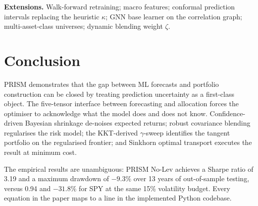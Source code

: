 \documentclass[10pt,twocolumn]{article}
\begin{document}
\textbf{Extensions.}
Walk-forward retraining; macro features; conformal prediction
intervals replacing the heuristic $\kappa$; GNN base learner on
the correlation graph; multi-asset-class universes; dynamic
blending weight $\zeta$.

\FloatBarrier
\section{Conclusion}\label{sec:conclusion}

PRISM demonstrates that the gap between ML forecasts and portfolio
construction can be closed by treating prediction uncertainty as a
first-class object.  The five-tensor interface between forecasting
and allocation forces the optimiser to acknowledge what the model
does and does not know.  Confidence-driven Bayesian shrinkage
de-noises expected returns; robust covariance blending regularises
the risk model; the KKT-derived $\gamma$-sweep identifies the
tangent portfolio on the regularised frontier; and Sinkhorn optimal
transport executes the result at minimum cost.

The empirical results are unambiguous: PRISM No-Lev achieves a
Sharpe ratio of 3.19 and a maximum drawdown of $-9.3\%$ over 13
years of out-of-sample testing, versus 0.94 and $-31.8\%$ for
SPY at the same 15\% volatility budget.  Every equation in the
paper maps to a line in the implemented Python codebase.
\end{document}
